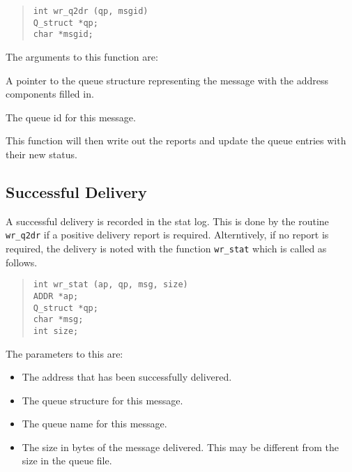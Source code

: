 \begin{quote}\begin{verbatim}
int wr_q2dr (qp, msgid)
Q_struct *qp;
char *msgid;
\end{verbatim}\end{quote}

The arguments to this function are:
\begin{describe}
\item[\verb|qp|:]	A pointer to the queue structure representing
the message with the address components filled in.

\item[\verb|msgid|:] The queue id for this message.
\end{describe}

This function will then write out the reports and update the queue
entries with their new status.

\subsection{Successful Delivery}

A successful delivery is recorded in the stat log. This is done
by the routine \verb|wr_q2dr| if a positive delivery report is
required. Alterntively, if no report is required, the delivery is
noted with the function \verb|wr_stat| which is called as follows.

\begin{quote}\begin{verbatim}
int wr_stat (ap, qp, msg, size)
ADDR *ap;
Q_struct *qp;
char *msg;
int size;
\end{verbatim}\end{quote}
The parameters to this are:
\begin{itemize}
\item[\verb|ap|:] The address that has been successfully delivered.
\item[\verb|qp|:] The queue structure for this message.
\item[\verb|msg|:] The queue name for this message.
\item[\verb|size|:] The size in bytes of the message delivered. This
may be different from the size in the queue file.
\end{itemize}


